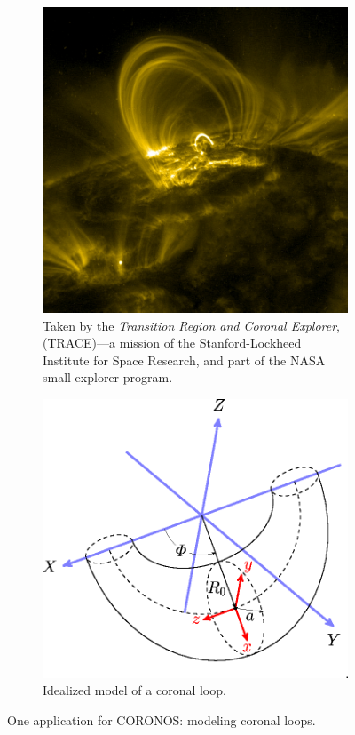 \documentclass[12pt]{memoir}
\newcommand{\coronos}{\textsf{CORONOS}}
\begin{document}
  \begin{figure}[ht]
    \centering
    \begin{subfigure}[t]{0.45\textwidth}
       \includegraphics[scale=0.23]{figonea.jpg}
       \caption{ Taken by the {\em Transition Region and Coronal Explorer},
                 (TRACE)---a mission of the Stanford-Lockheed Institute for 
                 Space Research, and part of the NASA small explorer program.
                 \label{fig:figonea}
               }
    \end{subfigure}
%
    \hspace {0.05\textwidth}
%
    \begin{subfigure}[t]{0.45\textwidth}
       \includegraphics[scale=0.80]{figoneb.eps}
       \caption{Idealized model of a coronal loop.
                \label{fig:figoneb}
               }
    \end{subfigure}
%
    \caption{One application for \coronos: modeling coronal loops.
                \label{fig:figone}}
  \end{figure}
\end{document}
